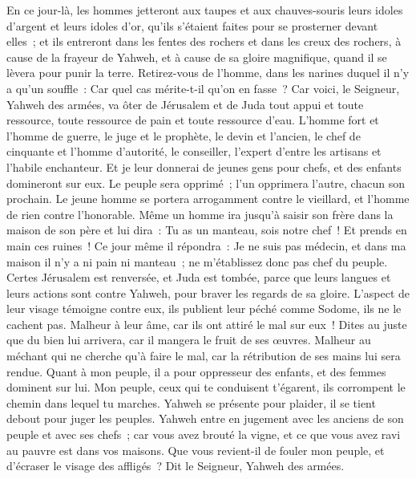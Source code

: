 \begin{multicols}{2}
En ce jour-là, les hommes jetteront aux taupes et aux chauves-souris leurs idoles d'argent et leurs idoles d'or, qu'ils s'étaient faites pour se prosterner devant elles~;
et ils entreront dans les fentes des rochers et dans les creux des rochers, à cause de la frayeur de Yahweh, et à cause de sa gloire magnifique, quand il se lèvera pour punir la terre.
Retirez-vous de l'homme, dans les narines duquel il n'y a qu'un souffle~: Car quel cas mérite-t-il qu'on en fasse~?
\VerseOne{}Car voici, le Seigneur, Yahweh des armées, va ôter de Jérusalem et de Juda tout appui et toute ressource, toute ressource de pain et toute ressource d'eau.
L'homme fort et l'homme de guerre, le juge et le prophète, le devin et l'ancien,
le chef de cinquante et l'homme d'autorité, le conseiller, l'expert d'entre les artisans et l'habile enchanteur.
Et je leur donnerai de jeunes gens pour chefs, et des enfants domineront sur eux.
Le peuple sera opprimé~; l'un opprimera l'autre, chacun son prochain. Le jeune homme se portera arrogamment contre le vieillard, et l'homme de rien contre l'honorable.
Même un homme ira jusqu'à saisir son frère dans la maison de son père et lui dira~: Tu as un manteau, sois notre chef~! Et prends en main ces ruines~!
Ce jour même il répondra~: Je ne suis pas médecin, et dans ma maison il n'y a ni pain ni manteau~; ne m'établissez donc pas chef du peuple.
Certes Jérusalem est renversée, et Juda est tombée, parce que leurs langues et leurs actions sont contre Yahweh, pour braver les regards de sa gloire.
L'aspect de leur visage témoigne contre eux, ils publient leur péché comme Sodome, ils ne le cachent pas. Malheur à leur âme, car ils ont attiré le mal sur eux~!
Dites au juste que du bien lui arrivera, car il mangera le fruit de ses œuvres.
Malheur au méchant qui ne cherche qu'à faire le mal, car la rétribution de ses mains lui sera rendue.
Quant à mon peuple, il a pour oppresseur des enfants, et des femmes dominent sur lui. Mon peuple, ceux qui te conduisent t'égarent, ils corrompent le chemin dans lequel tu marches.
Yahweh se présente pour plaider, il se tient debout pour juger les peuples.
Yahweh entre en jugement avec les anciens de son peuple et avec ses chefs~; car vous avez brouté la vigne, et ce que vous avez ravi au pauvre est dans vos maisons.
Que vous revient-il de fouler mon peuple, et d'écraser le visage des affligés~? Dit le Seigneur, Yahweh des armées.

\end{multicols}
